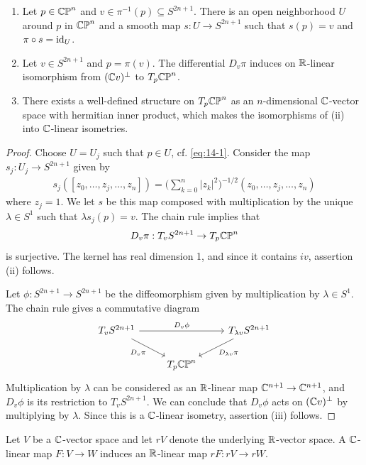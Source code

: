 \begin{lemma}\label{lemma:14-4}
  \begin{enumerate}
    \item Let $p\in\mathbb{CP}^n$ and $v\in\pi^{-1}(p)\subseteq S^{2n+1}$. There is an open neighborhood
      $U$ around $p$ in $\mathbb{CP}^n$ and a smooth map $s:U\to S^{2n+1}$ such that $s(p)=v$ and $\pi\circ s=\operatorname{id}_U$.
    \item Let $v\in S^{2n+1}$ and $p=\pi(v)$. The differential $D_v\pi$ induces on ${\mathbb{R}}$-linear isomorphism
      from $({\mathbb{C}} v)^\perp$ to $T_p\mathbb{CP}^n$.
    \item There exists a well-defined structure on $T_p\mathbb{CP}^n$ as an $n$-dimensional ${\mathbb{C}}$-vector space with 
      hermitian inner product, which makes the isomorphisms of (ii) into ${\mathbb{C}}$-linear isometries.
  \end{enumerate}
\end{lemma}

\begin{proof}
  Choose $U=U_j$ such that $p\in U$, cf. \eqref{eq:14-1}. Consider the map $s_j:U_j\to S^{2n+1}$ given by 
  \begin{align}\label{eq:14-7}
    s_j([z_0, \ldots, z_j, \ldots, z_n]) 
    = \biggl(\sum_{k=0}^{n }{|z_k|^2}\biggr)^{-1/2}(z_0, \ldots, z_j, \ldots, z_n)
  \end{align}
  where $z_j=1$. We let $s$ be this map composed with multiplication by the unique $\lambda\in S^1$ such 
  that $\lambda s_j(p)=v$. The chain rule implies that
  \[
    D_v\pi: T_v S^{2n+1}\to T_p\mathbb{CP}^n
  \]
  is surjective. The kernel has real dimension 1, and since it contains $iv$, assertion (ii) follows.

  Let $\phi:S^{2n+1}\to S^{2n+1}$ be the diffeomorphism given by multiplication by $\lambda\in S^1$.
  The chain rule gives a commutative diagram
  \[\begin{tikzcd}
    T_v S^{2n+1} \arrow[rr, "D_v\phi"] \arrow[rd, "D_{v}\pi"'] & & T_{\lambda v} S^{2n+1} \arrow[ld, "D_{\lambda v}\pi"]\\
    & T_p\CP^n &
  \end{tikzcd}\]
  Multiplication by $\lambda$ can be considered as an ${\mathbb{R}}$-linear map ${\mathbb{C}}^{n+1}\to{\ensuremath{\mathbb{C}}}^{n+1}$, and
  $D_v\phi$ is its restriction to $T_vS^{2n+1}$. We can conclude that $D_v\phi$ acts on $({\mathbb{C}} v)^\perp$ by
  multiplying by $\lambda$. Since this is a ${\mathbb{C}}$-linear isometry, assertion (iii) follows.
\end{proof}

Let $V$ be a ${\mathbb{C}}$-vector space and let $rV$ denote the underlying ${\mathbb{R}}$-vector space. A
${\mathbb{C}}$-linear map $F: V\to W$ induces an ${\mathbb{R}}$-linear map $rF: rV\to rW$.

